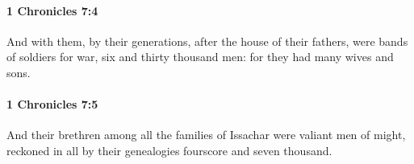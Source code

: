 		\paragraph{1 Chronicles 7:4} %
			\label{1CHRONICLES-7-4}

			And with them, by their generations, after the house of their fathers, were bands of soldiers for war, six and thirty thousand men: for they had many wives and sons.


		\paragraph{1 Chronicles 7:5} %
			\label{1CHRONICLES-7-5}

			And their brethren among all the families of Issachar were valiant men of might, reckoned in all by their genealogies fourscore and seven thousand.



